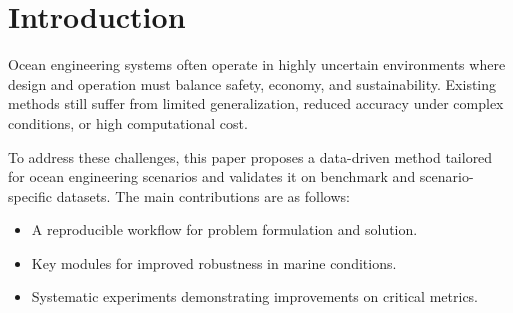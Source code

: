 \section{Introduction}

Ocean engineering systems often operate in highly uncertain environments where design and operation must balance safety, economy, and sustainability. Existing methods still suffer from limited generalization, reduced accuracy under complex conditions, or high computational cost.

To address these challenges, this paper proposes a data-driven method tailored for ocean engineering scenarios and validates it on benchmark and scenario-specific datasets. The main contributions are as follows:
\begin{itemize}
  \item A reproducible workflow for problem formulation and solution.
  \item Key modules for improved robustness in marine conditions.
  \item Systematic experiments demonstrating improvements on critical metrics.
\end{itemize}
